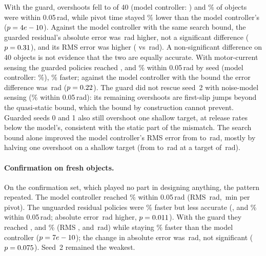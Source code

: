 \documentclass[11pt]{article}
\begin{document}
With the guard, overshoots fell to \OverAllResG{} of 40 (model controller: \OverAllMod) and \IResGFive\% of objects were within 0.05\,rad, while pivot time stayed \IResGTimeCut\% lower than the model controller's ($p=4e-10$). Against the model controller with the same search bound, the guarded residual's absolute error was \IGvGdE{}\,rad higher, not a significant difference ($p=0.31$), and its RMS error was higher (\IResGRms{} vs \IModGRms\,rad). A non-significant difference on 40 objects is not evidence that the two are equally accurate. With motor-current sensing the guarded policies reached \CResGFivea, \CResGFiveb{} and \CResGFivec\% within 0.05\,rad by seed (model controller: \CModFive\%), \CResGTimeCut\% faster; against the model controller with the bound the error difference was \CGvGdE{}\,rad ($p=0.22$). The guard did not rescue seed~2 with noise-model sensing (\IResGFivec\% within 0.05\,rad): its remaining overshoots are first-slip jumps beyond the quasi-static bound, which the bound by construction cannot prevent. Guarded seeds 0 and 1 also still overshoot one shallow target, at release rates below the model's, consistent with the static part of the mismatch. The search bound alone improved the model controller's RMS error from \IModRms{} to \IModGRms{}\,rad, mostly by halving one overshoot on a shallow target (from \ObjSevenMod{} to \ObjSevenModG{}\,rad at a target of \ObjSevenTgt{}\,rad).

\paragraph{Confirmation on fresh objects.} On the confirmation set, which played no part in designing anything, the pattern repeated. The model controller reached \KModFive\% within 0.05\,rad (RMS \KModRms\,rad, \KModTime\,min per pivot). The unguarded residual policies were \KResTimeCut\% faster but less accurate (\KResFivea, \KResFiveb{} and \KResFivec\% within 0.05\,rad; absolute error \KResdE\,rad higher, $p=0.011$). With the guard they reached \KResGFivea, \KResGFiveb{} and \KResGFivec\% (RMS \KResGRmsa, \KResGRmsb{} and \KResGRmsc\,rad) while staying \KResGTimeCut\% faster than the model controller ($p=7e-10$); the change in absolute error was \KResGdE\,rad, not significant ($p=0.075$). Seed~2 remained the weakest.
\end{document}
